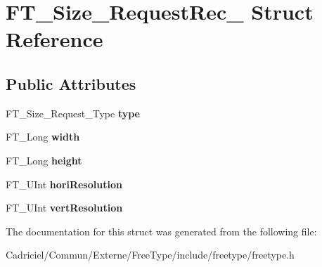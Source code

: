 \hypertarget{struct_f_t___size___request_rec__}{\section{F\-T\-\_\-\-Size\-\_\-\-Request\-Rec\-\_\- Struct Reference}
\label{struct_f_t___size___request_rec__}
}
\subsection*{Public Attributes}
\begin{DoxyCompactItemize}
\item 
\hypertarget{struct_f_t___size___request_rec___a7644b04dd2b26c0698df558775320494}{F\-T\-\_\-\-Size\-\_\-\-Request\-\_\-\-Type {\bfseries type}}\label{struct_f_t___size___request_rec___a7644b04dd2b26c0698df558775320494}

\item 
\hypertarget{struct_f_t___size___request_rec___a7b044d36af318b053d5e3939eb0d5039}{F\-T\-\_\-\-Long {\bfseries width}}\label{struct_f_t___size___request_rec___a7b044d36af318b053d5e3939eb0d5039}

\item 
\hypertarget{struct_f_t___size___request_rec___af8142450d8d032e1870d758cdcfa51a9}{F\-T\-\_\-\-Long {\bfseries height}}\label{struct_f_t___size___request_rec___af8142450d8d032e1870d758cdcfa51a9}

\item 
\hypertarget{struct_f_t___size___request_rec___a3a85704d13561d9db53aa60f7805ec73}{F\-T\-\_\-\-U\-Int {\bfseries hori\-Resolution}}\label{struct_f_t___size___request_rec___a3a85704d13561d9db53aa60f7805ec73}

\item 
\hypertarget{struct_f_t___size___request_rec___a86601c38d91064b6efe256a9e99c56f4}{F\-T\-\_\-\-U\-Int {\bfseries vert\-Resolution}}\label{struct_f_t___size___request_rec___a86601c38d91064b6efe256a9e99c56f4}

\end{DoxyCompactItemize}


The documentation for this struct was generated from the following file\-:\begin{DoxyCompactItemize}
\item 
Cadriciel/\-Commun/\-Externe/\-Free\-Type/include/freetype/freetype.\-h\end{DoxyCompactItemize}

